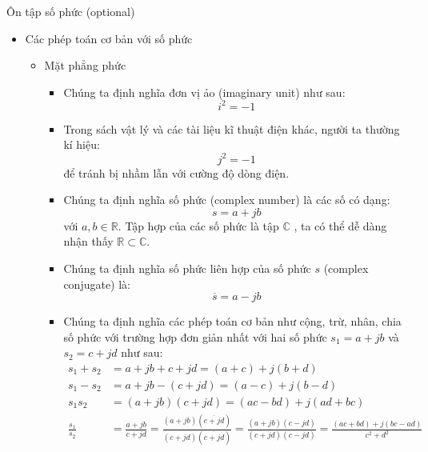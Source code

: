 \documentclass[8pt]{beamer}
\begin{document}
\begin{frame}{Ôn tập số phức (optional)}
	\begin{itemize}
		\item{Các phép toán cơ bản với số phức}
			\begin{itemize}
				\item Mặt phẳng phức
					\begin{itemize}
						\item Chúng ta định nghĩa đơn vị ảo (imaginary unit) như sau: $$i^2=-1$$
						\item Trong sách vật lý và các tài liệu kĩ thuật điện khác, người ta thường kí hiệu: $$j^2=-1$$ để tránh bị nhầm lẫn với cường độ dòng điện.
						\item Chúng ta định nghĩa số phức (complex number) là các số có dạng: $$s=a+jb$$ với $a,b\in\mathbb{R}$. Tập hợp của các số phức là tập $\mathbb{C}$
							, ta có thể dễ dàng nhận thấy $\mathbb{R}\subset\mathbb{C}$.
						\item Chúng ta định nghĩa số phức liên hợp của số phức $s$ (complex conjugate) là:
							$$\overline{s}=a-jb$$
						\item Chúng ta định nghĩa các phép toán cơ bản như cộng, trừ, nhân, chia số phức với trường hợp đơn giản nhất với hai số phức $s_{1}=a+jb$ và $s_{2}=c+jd$ như sau: 
\begin{equation*}
	\begin{split}
		s_{1}+s_{2}&=a+jb+c+jd=(a+c)+j(b+d) \\
		s_{1}-s_{2}&=a+jb-(c+jd)=(a-c)+j(b-d) \\
		s_{1}s_{2}&=(a+jb)(c+jd)=(ac-bd)+j(ad+bc)\\
		\frac{s_{1}}{s_{2}}&=\frac{a+jb}{c+jd}=\frac{(a+jb){(\overline{c+jd})}}{(c+jd)(\overline{c+jd})}=\frac{(a+jb)(c-jd)}{(c+jd)(c-jd)}=\frac{(ac+bd)+j(bc-ad)}{c^2+d^2}\\
	\end{split}
\end{equation*}
					\end{itemize}
			\end{itemize}
	\end{itemize}
\end{frame}
\end{document}
